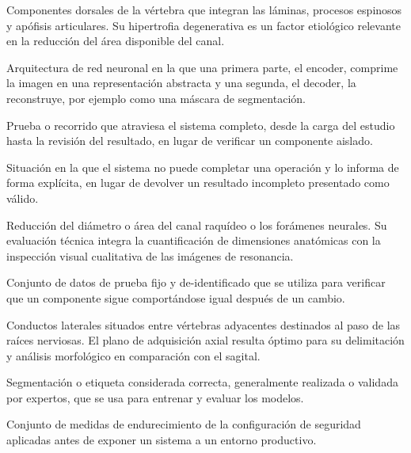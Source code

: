 \begin{description}[leftmargin=3.8cm, style=nextline, itemsep=3pt, topsep=3pt]
    \item[Elemento posterior (PE)] Componentes dorsales de la vértebra que integran las láminas, procesos espinosos y apófisis articulares. Su hipertrofia degenerativa es un factor etiológico relevante en la reducción del área disponible del canal.

    \item[Encoder-decoder] Arquitectura de red neuronal en la que una primera parte, el encoder, comprime la imagen en una representación abstracta y una segunda, el decoder, la reconstruye, por ejemplo como una máscara de segmentación.

    \item[End-to-end (E2E)] Prueba o recorrido que atraviesa el sistema completo, desde la carga del estudio hasta la revisión del resultado, en lugar de verificar un componente aislado.

    \item[Estado degradado] Situación en la que el sistema no puede completar una operación y lo informa de forma explícita, en lugar de devolver un resultado incompleto presentado como válido.

    \item[Estenosis] Reducción del diámetro o área del canal raquídeo o los forámenes neurales. Su evaluación técnica integra la cuantificación de dimensiones anatómicas con la inspección visual cualitativa de las imágenes de resonancia.

    \item[Fixture] Conjunto de datos de prueba fijo y de-identificado que se utiliza para verificar que un componente sigue comportándose igual después de un cambio.

    \item[Forámenes neurales (neuroforámenes)] Conductos laterales situados entre vértebras adyacentes destinados al paso de las raíces nerviosas. El plano de adquisición axial resulta óptimo para su delimitación y análisis morfológico en comparación con el sagital.

    \item[Ground truth, anotación de referencia] Segmentación o etiqueta considerada correcta, generalmente realizada o validada por expertos, que se usa para entrenar y evaluar los modelos.

    \item[Hardening] Conjunto de medidas de endurecimiento de la configuración de seguridad aplicadas antes de exponer un sistema a un entorno productivo.


\end{description}
